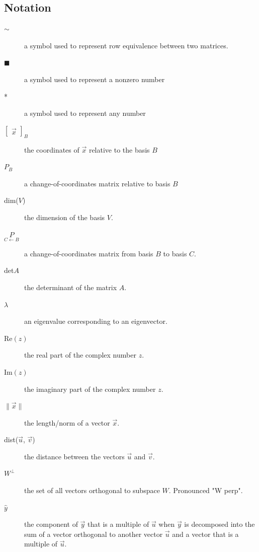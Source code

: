 \documentclass[a4paper,12pt]{article}
\theoremstyle{definition}
\theoremstyle{definition}
\newcommand{\basiscoordvec}[2]{
	\begin{bmatrix}
		\vec{#1}
	\end{bmatrix}_#2
}
\newcommand{\chngbasismat}[2]{
	\underset{#2 \leftarrow #1}{P}
}
\newcommand{\norm}[1]{\lVert #1 \rVert}
\newcommand{\normvec}[1]{\norm{\vec{#1}}}
\begin{document}
	\subsection{Notation}
	\begin{description}
		\item[$\sim$] a symbol used to represent row equivalence between two matrices.
		
		\item[$\blacksquare$] a symbol used to represent a nonzero number
		
		\item[*] a symbol used to represent any number
		
		\item[$\basiscoordvec{x}{B}$] the coordinates of $\vec{x}$ relative to the basis $B$
		
		\item[$P_B$] a change-of-coordinates matrix relative to basis $B$
		
		\item[dim($V$)] the dimension of the basis $V$.
		
		\item[$\chngbasismat{B}{C}$] a change-of-coordinates matrix from basis $B$ to basis $C$.
		
		\item[det$A$] the determinant of the matrix $A$.
		
		\item[$\lambda$] an eigenvalue corresponding to an eigenvector.
		
		\item[Re$(z)$] the real part of the complex number $z$.
		
		\item[Im$(z)$] the imaginary part of the complex number $z$.
		
		\item[$\normvec{x}$] the length/norm of a vector $\vec{x}$.
		
		\item[dist($\vec{u}$, $\vec{v}$)] the distance between the vectors $\vec{u}$ and $\vec{v}$.
		
		\item[$W^\perp$] the set of all vectors orthogonal to subspace $W$. Pronounced "W perp".
		
		\item[$\hat{y}$] the component of $\vec{y}$ that is a multiple of $\vec{u}$ when $\vec{y}$ is decomposed into the sum of a vector orthogonal to another vector $\vec{u}$ and a vector that is a multiple of $\vec{u}$.
	\end{description}
	
\end{document}

